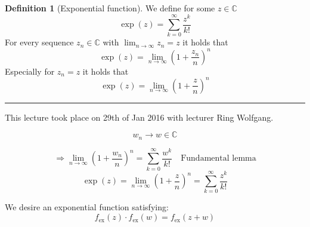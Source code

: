 \documentclass[a4paper,landscape,twocolumn]{article}
\theoremstyle{definition}
\newtheorem{defi}{Definition}
\newcommand\meta[3]{\hrule{} This #1 took place on #2 with lecturer #3.\par}
\begin{document}
\begin{defi}[Exponential function]
  We define for some $z \in \mathbb C$
  \[ \operatorname{exp}(z) = \sum_{k=0}^\infty \frac{z^k}{k!} \]
  For every sequence $z_n \in \mathbb C$ with $\lim_{n\to\infty} z_n = z$ it holds that
  \[ \operatorname{exp}(z) = \lim_{n\to\infty} \left(1 + \frac{z_n}{n}\right)^n \]
  Especially for $z_n = z$ it holds that
  \[ \operatorname{exp}(z) = \lim_{n\to\infty} \left(1 + \frac{z}{n}\right)^n \]
\end{defi}

\meta{lecture}{29th of Jan 2016}{Ring Wolfgang}

\[ w_n \to w \in \mathbb C \]

\[
  \Rightarrow \lim_{n\to\infty} \left(1 + \frac{w_n}{n}\right)^n
  = \sum_{k=0}^\infty \frac{w^k}{k!}
  \quad \text{Fundamental lemma}
\] \[
  \exp(z)
  = \lim_{n\to\infty} \left(1 + \frac zn\right)^n
  = \sum_{k=0}^\infty \frac{z^k}{k!}
\]

We desire an exponential function satisfying:
\[ f_{\text{ex}}(z) \cdot f_{\text{ex}}(w) = f_{\text{ex}}(z + w) \]
\end{document}
